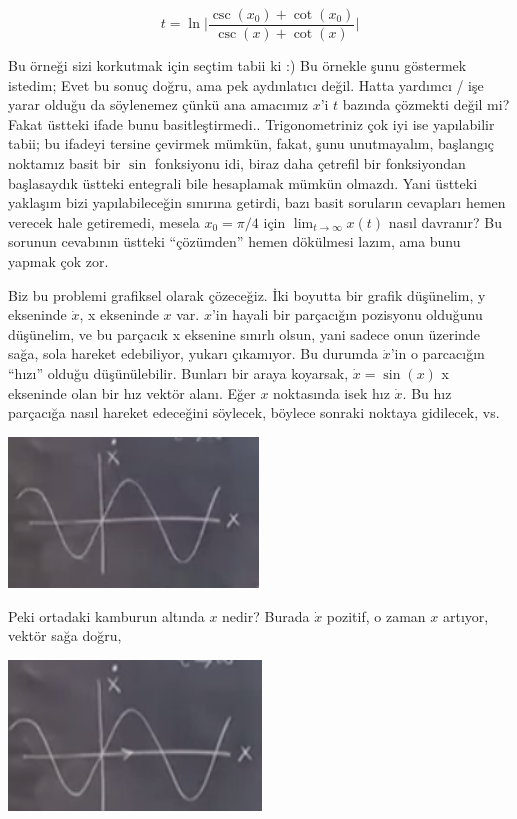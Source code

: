 \documentclass[12pt,fleqn]{article}\usepackage{../../common}
\begin{document}
$$ t = \ln \bigg| \frac{\csc(x_0) + \cot(x_0)}{\csc(x) + \cot(x)} \bigg|   $$

Bu örneği sizi korkutmak için seçtim tabii ki :) Bu örnekle şunu göstermek
istedim; Evet bu sonuç doğru, ama pek aydınlatıcı değil. Hatta yardımcı / işe
yarar olduğu da söylenemez çünkü ana amacımız $x$'i $t$ bazında çözmekti değil
mi? Fakat üstteki ifade bunu basitleştirmedi.. Trigonometriniz çok iyi ise
yapılabilir tabii; bu ifadeyi tersine çevirmek mümkün, fakat, şunu unutmayalım,
başlangıç noktamız basit bir $\sin$ fonksiyonu idi, biraz daha çetrefil bir
fonksiyondan başlasaydık üstteki entegrali bile hesaplamak mümkün olmazdı. Yani
üstteki yaklaşım bizi yapılabileceğin sınırına getirdi, bazı basit soruların
cevapları hemen verecek hale getiremedi, mesela $x_0 = \pi / 4$ için $\lim_{t
  \to \infty} x(t)$ nasıl davranır? Bu sorunun cevabının üstteki ``çözümden''
hemen dökülmesi lazım, ama bunu yapmak çok zor.

Biz bu problemi grafiksel olarak çözeceğiz. İki boyutta bir grafik düşünelim, y
ekseninde $\dot{x}$, x ekseninde $x$ var. $x$'in hayali bir parçacığın pozisyonu
olduğunu düşünelim, ve bu parçacık x eksenine sınırlı olsun, yani sadece onun
üzerinde sağa, sola hareket edebiliyor, yukarı çıkamıyor. Bu durumda
$\dot{x}$'in o parcacığın ``hızı'' olduğu düşünülebilir. Bunları bir araya
koyarsak, $\dot{x} = \sin(x)$ x ekseninde olan bir hız vektör alanı. Eğer $x$
noktasında isek hız $\dot{x}$. Bu hız parçacığa nasıl hareket edeceğini
söylecek, böylece sonraki noktaya gidilecek, vs.

\includegraphics[height=4cm]{1_02.png}

Peki ortadaki kamburun altında $x$ nedir? Burada $\dot{x}$ pozitif, o zaman
$x$ artıyor, vektör sağa doğru, 

\includegraphics[height=4cm]{1_03.png}
\end{document}
